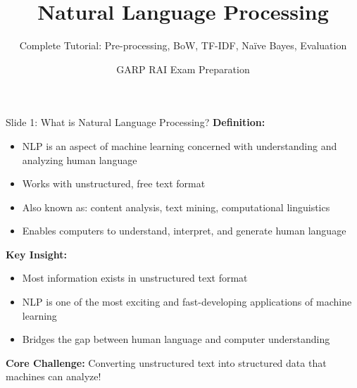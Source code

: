 \documentclass[8pt]{beamer}
\title{Natural Language Processing}
\subtitle{Complete Tutorial: Pre-processing, BoW, TF-IDF, Naïve Bayes, Evaluation}
\author{GARP RAI Exam Preparation}
\date{}
\begin{document}
	
	\begin{frame}
		\titlepage
	\end{frame}
	
	
	\begin{frame}{Slide 1: What is Natural Language Processing?}
		\fontsize{6.5}{7.5}\selectfont
		\textbf{Definition:}
		\begin{itemize}
			\item NLP is an aspect of machine learning concerned with understanding and analyzing human language
			\item Works with unstructured, free text format
			\item Also known as: content analysis, text mining, computational linguistics
			\item Enables computers to understand, interpret, and generate human language
		\end{itemize}
		
		\vspace{0.1cm}
		\textbf{Key Insight:}
		\begin{itemize}
			\item Most information exists in unstructured text format
			\item NLP is one of the most exciting and fast-developing applications of machine learning
			\item Bridges the gap between human language and computer understanding
		\end{itemize}
		
		\textcolor{myblue}{\textbf{Core Challenge:}} Converting unstructured text into structured data that machines can analyze!
	\end{frame}
	
\end{document}
